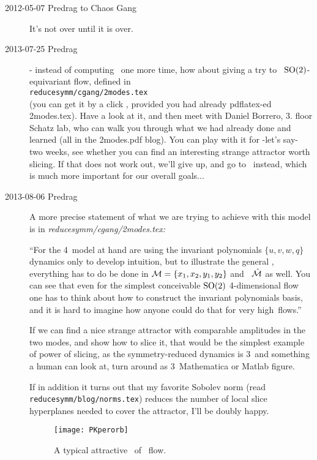 \begin{description}
\item[2012-05-07  Predrag to Chaos Gang] It's not over until it is over.

\item[2013-07-25  Predrag]
 - instead of computing \cLf\ one more
time, how about giving a try to \twoMode\ $\textrm{SO}(2)$-equivariant flow,
defined in
\\
\texttt{reducesymm/cgang/2modes.tex}
\\ (you can get it by a click
, provided you had already pdflatex-ed
2modes.tex). Have a look at it, and then meet with Daniel Borrero, 3. floor
Schatz lab, who can walk you through what we had already done and learned
(all in the 2modes.pdf blog). You can play with it for -let's say- two
weeks, see whether you can find an interesting strange attractor worth
slicing. If that does not work out, we'll give up, and go to \KS\ instead,
which is much more important for our overall goals...

\item[2013-08-06 Predrag]
A more precise statement of what we are trying to achieve with this model is
in \emph{reducesymm/cgang/2modes.tex:}

``For the 4\dmn\ model at hand are using the invariant polynomials
$\{u,v,w,q\}$ dynamics only to develop intuition, but to illustrate the
general \mslices, everything has to do be done in ${\cal M} =
\{x_1,x_2,y_1,y_2\}$ and \slice\ $\hat{\cal M}$ as well. You can see that even
for the simplest conceivable $\textrm{SO}(2)$ 4-dimensional flow one has to
think about how to construct the invariant polynomials basis, and it is
hard to imagine how anyone could do that for very high\dmn\ flows.''

If we can find a nice strange attractor with comparable amplitudes in the
two modes, and show how to slice it, that would be the simplest example of
power of slicing, as the symmetry-reduced dynamics is 3\dmn\ and something
a human can look at, turn around as 3\dmn\ Mathematica or Matlab figure.

If in addition it turns out that my favorite Sobolev norm (read
\texttt{reducesymm/blog/norms.tex}) reduces the number of local slice
hyperplanes needed to cover the attractor, I'll be doubly happy.

\begin{figure}[ht]
\begin{center}
\texttt{[image: PKperorb]}
\end{center}
\caption{A typical
attractive \reqv\  of \twoMode\ flow.}
\label{fig:PKperorb}
\end{figure}


\end{description}
